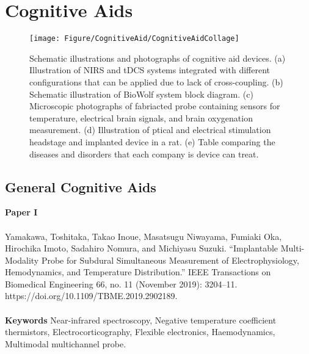 \newpage
\section{Cognitive Aids}

\begin{figure}[t]
    \centering
    \texttt{[image: Figure/CognitiveAid/CognitiveAidCollage]}
    \caption{Schematic illustrations and photographs of cognitive aid devices. (a) Illustration of NIRS and tDCS systems integrated with different configurations that can be applied due to lack of cross-coupling. (b) Schematic illustration of BioWolf system block diagram. (c) Microscopic photographs of fabriacted probe containing sensors for temperature, electrical brain signals, and brain oxygenation measurement. (d) Illustration of ptical and electrical stimulation headstage and implanted device in a rat. (e) Table comparing the diseases and disorders that each company is device can treat.}
    \label{fig:Wu}
\end{figure}

\subsection{General Cognitive Aids}

\textbf{Paper I} 
\\ \\
\noindent
Yamakawa, Toshitaka, Takao Inoue, Masatsugu Niwayama, Fumiaki Oka, Hirochika Imoto, Sadahiro Nomura, and Michiyasu Suzuki. “Implantable Multi-Modality Probe for Subdural Simultaneous Measurement of Electrophysiology, Hemodynamics, and Temperature Distribution.” IEEE Transactions on Biomedical Engineering 66, no. 11 (November 2019): 3204–11. https://doi.org/10.1109/TBME.2019.2902189. \\ \\

\noindent
\textbf{Keywords} Near-infrared spectroscopy, Negative temperature coefficient thermistors, Electrocorticography, Flexible electronics, Haemodynamics, Multimodal multichannel probe. \\ \\

